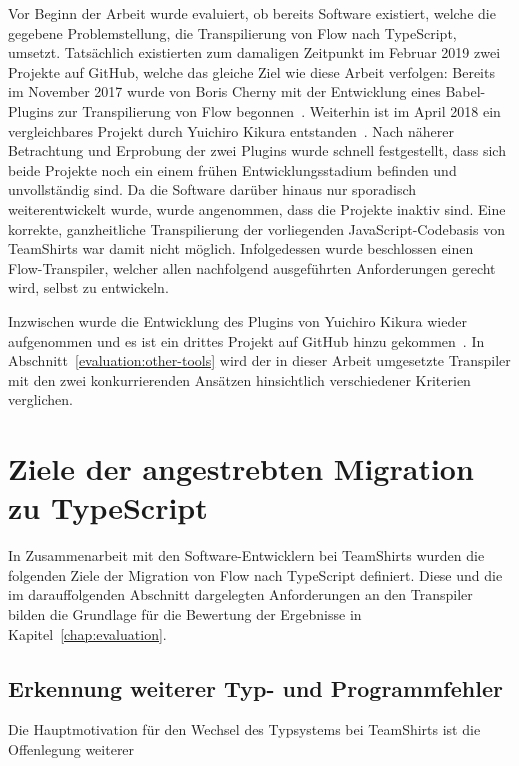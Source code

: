 Vor Beginn der Arbeit wurde evaluiert, ob bereits Software existiert, welche die gegebene Problemstellung, die Transpilierung von Flow nach TypeScript, umsetzt. Tatsächlich existierten zum damaligen Zeitpunkt im Februar 2019 zwei Projekte auf GitHub, welche das gleiche Ziel wie diese Arbeit verfolgen: Bereits im November 2017 wurde von Boris Cherny mit der Entwicklung eines Babel-Plugins zur Transpilierung von Flow begonnen~\autocite{CHERNY:FLOW_TO_TS}. Weiterhin ist im April 2018 ein vergleichbares Projekt durch Yuichiro Kikura entstanden~\autocite{KIKURA:FLOW_TO_TS}. Nach näherer Betrachtung und Erprobung der zwei Plugins wurde schnell festgestellt, dass sich beide Projekte noch ein einem frühen Entwicklungsstadium befinden und unvollständig sind. Da die Software darüber hinaus nur sporadisch weiterentwickelt wurde, wurde angenommen, dass die Projekte inaktiv sind. Eine korrekte, ganzheitliche Transpilierung der vorliegenden JavaScript-Codebasis von TeamShirts war damit nicht möglich. Infolgedessen wurde beschlossen einen Flow-Transpiler, welcher allen nachfolgend ausgeführten Anforderungen gerecht wird, selbst zu entwickeln.

Inzwischen wurde die Entwicklung des Plugins von Yuichiro Kikura wieder aufgenommen und es ist ein drittes Projekt auf GitHub hinzu gekommen~\autocite{KHAN:FLOW_TO_TS}. In Abschnitt~\ref{evaluation:other-tools} wird der in dieser Arbeit umgesetzte Transpiler mit den zwei konkurrierenden Ansätzen hinsichtlich verschiedener Kriterien verglichen.

\section{Ziele der angestrebten Migration zu TypeScript}
\label{analysis:goals}

In Zusammenarbeit mit den Software-Entwicklern bei TeamShirts wurden die folgenden Ziele der Migration von Flow nach TypeScript definiert. Diese und die im darauffolgenden Abschnitt dargelegten Anforderungen an den Transpiler bilden die Grundlage für die Bewertung der Ergebnisse in Kapitel~\ref{chap:evaluation}.

\subsection{Erkennung weiterer Typ- und Programmfehler}

Die Hauptmotivation für den Wechsel des Typsystems bei TeamShirts ist die Offenlegung weiterer

